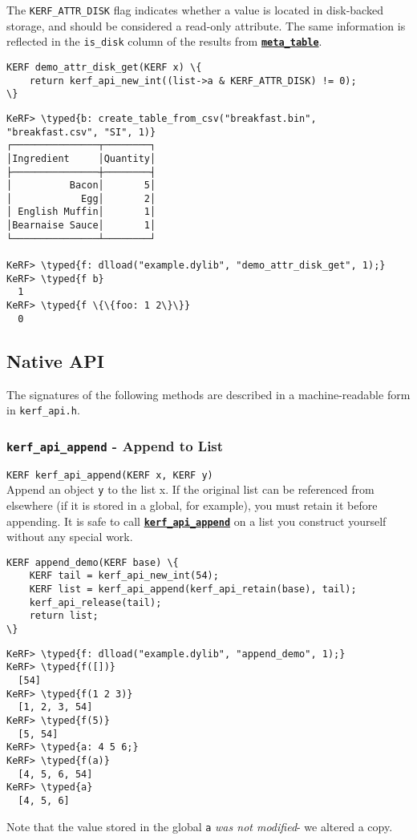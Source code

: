 \documentclass{article}
\newcommand{\typed}[1]{\textcolor{TealBlue}{#1}}
\newcommand{\primu}[2]{\hyperref[prim:#2]{\textbf{\texttt{#1}}}}
\newcommand{\ffidef}[3]{\subsubsection{\texttt{#1} - #2}\label{ffi:#3}}
\newcommand{\ffi}[2]{\hyperref[ffi:#2]{\textbf{\texttt{#1}}}}
\begin{document}
\pagebreak
The \texttt{KERF\_ATTR\_DISK} flag indicates whether a value is located in disk-backed storage, and should be considered a read-only attribute. The same information is reflected in the \texttt{is\_disk} column of the results from \primu{meta\_table}{metaTable}.
\begin{Verbatim}
KERF demo_attr_disk_get(KERF x) \{
	return kerf_api_new_int((list->a & KERF_ATTR_DISK) != 0);
\}
\end{Verbatim}
\begin{Verbatim}
KeRF> \typed{b: create_table_from_csv("breakfast.bin", "breakfast.csv", "SI", 1)}
┌───────────────┬────────┐
│Ingredient     │Quantity│
├───────────────┼────────┤
│          Bacon│       5│
│            Egg│       2│
│ English Muffin│       1│
│Bearnaise Sauce│       1│
└───────────────┴────────┘

KeRF> \typed{f: dlload("example.dylib", "demo_attr_disk_get", 1);}
KeRF> \typed{f b}
  1
KeRF> \typed{f \{\{foo: 1 2\}\}}
  0
\end{Verbatim}

\pagebreak
\subsection{Native API}
The signatures of the following methods are described in a machine-readable form in \texttt{kerf\_api.h}.

\ffidef{kerf\_api\_append}{Append to List}{kerfApiAppend}
\texttt{KERF kerf\_api\_append(KERF x, KERF y)}\\

Append an object \texttt{y} to the list {x}. If the original list can be referenced from elsewhere (if it is stored in a global, for example), you must retain it before appending. It is safe to call \ffi{kerf\_api\_append}{kerfApiAppend} on a list you construct yourself without any special work.
\begin{Verbatim}
KERF append_demo(KERF base) \{
	KERF tail = kerf_api_new_int(54);
	KERF list = kerf_api_append(kerf_api_retain(base), tail);
	kerf_api_release(tail);
	return list;
\}
\end{Verbatim}
\begin{Verbatim}
KeRF> \typed{f: dlload("example.dylib", "append_demo", 1);}
KeRF> \typed{f([])}
  [54]
KeRF> \typed{f(1 2 3)}
  [1, 2, 3, 54]
KeRF> \typed{f(5)}
  [5, 54]
KeRF> \typed{a: 4 5 6;}
KeRF> \typed{f(a)}
  [4, 5, 6, 54]
KeRF> \typed{a}
  [4, 5, 6]
\end{Verbatim}
Note that the value stored in the global \texttt{a} \emph{was not modified}- we altered a copy.
\end{document}
